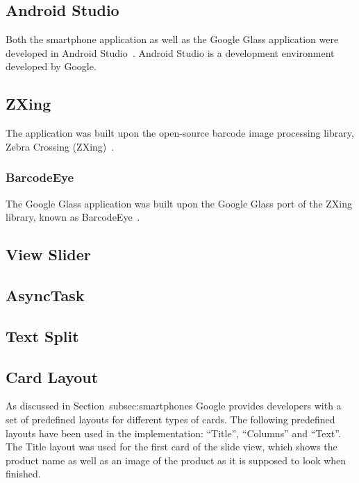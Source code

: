 

\subsection{Android Studio}
Both the smartphone application as well as the Google Glass application were developed in Android Studio~\cite{androidStudio}. Android Studio is a development environment developed by Google. %

\subsection{ZXing}
The application was built upon the open-source barcode image processing library, Zebra Crossing (ZXing)~\cite{zxing}. 

\subsubsection{BarcodeEye}
The Google Glass application was built upon the Google Glass port of the ZXing library, known as BarcodeEye~\cite{barcodeEye}.%

\subsection{View Slider}


\subsection{AsyncTask}


\subsection{Text Split}


\subsection{Card Layout}
As discussed in Section~{subsec:smartphones} Google provides developers with a set of predefined layouts for different types of cards. The following predefined layouts have been used in the implementation: ``Title'', ``Columns'' and ``Text''. The Title layout was used for the first card of the slide view, which shows the product name as well as an image of the product as it is supposed to look when finished.

